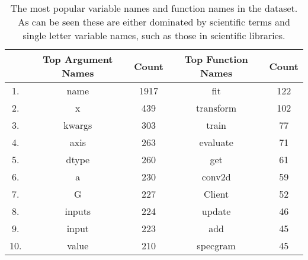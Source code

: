\begin{table}[h!]
    \begin{center}
    \begin{tabular}{c | c | c | c | c}
    & Top Argument Names & Count  &   Top Function Names & Count \\  
    \hline               
    1.   &  name     &     1917    &   fit       &    122 \\        
    2.   &  x        &     439     &   transform &    102 \\         
    3.   &  kwargs   &     303     &   train     &    77 \\         
    4.   &  axis     &     263     &   evaluate  &    71 \\        
    5.   &  dtype    &     260     &   get       &    61 \\         
    6.   &  a        &     230     &   conv2d    &    59 \\        
    7.   &  G        &     227     &   Client    &    52 \\        
    8.   &  inputs   &     224     &   update    &    46 \\        
    9.   &  input    &     223     &   add       &    45 \\         
    10.  &  value    &     210     &   specgram  &    45 \\         
    
    \end{tabular}
    \caption {The most popular variable names and function names in the dataset. As can be seen these are either dominated by scientific terms and single letter variable names, such as those in scientific libraries. }
    \label{table:popular_variable_names}
    \end{center}
\end{table}

